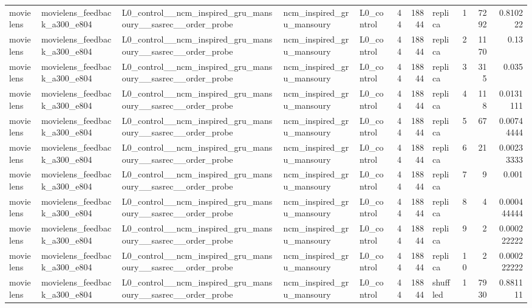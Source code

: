 \begin{table}[htbp!]
\begin{tabular}{lllllrrlrrr}
movielens & movielens\_feedback\_a300\_e804 & L0\_control\_\_ncm\_inspired\_gru\_mansoury\_\_sasrec\_\_order\_probe & ncm\_inspired\_gru\_mansoury & L0\_control & 44 & 18844 & replica & 1 & 7292 & 0.810222 \\
movielens & movielens\_feedback\_a300\_e804 & L0\_control\_\_ncm\_inspired\_gru\_mansoury\_\_sasrec\_\_order\_probe & ncm\_inspired\_gru\_mansoury & L0\_control & 44 & 18844 & replica & 2 & 1170 & 0.13 \\
movielens & movielens\_feedback\_a300\_e804 & L0\_control\_\_ncm\_inspired\_gru\_mansoury\_\_sasrec\_\_order\_probe & ncm\_inspired\_gru\_mansoury & L0\_control & 44 & 18844 & replica & 3 & 315 & 0.035 \\
movielens & movielens\_feedback\_a300\_e804 & L0\_control\_\_ncm\_inspired\_gru\_mansoury\_\_sasrec\_\_order\_probe & ncm\_inspired\_gru\_mansoury & L0\_control & 44 & 18844 & replica & 4 & 118 & 0.0131111 \\
movielens & movielens\_feedback\_a300\_e804 & L0\_control\_\_ncm\_inspired\_gru\_mansoury\_\_sasrec\_\_order\_probe & ncm\_inspired\_gru\_mansoury & L0\_control & 44 & 18844 & replica & 5 & 67 & 0.00744444 \\
movielens & movielens\_feedback\_a300\_e804 & L0\_control\_\_ncm\_inspired\_gru\_mansoury\_\_sasrec\_\_order\_probe & ncm\_inspired\_gru\_mansoury & L0\_control & 44 & 18844 & replica & 6 & 21 & 0.00233333 \\
movielens & movielens\_feedback\_a300\_e804 & L0\_control\_\_ncm\_inspired\_gru\_mansoury\_\_sasrec\_\_order\_probe & ncm\_inspired\_gru\_mansoury & L0\_control & 44 & 18844 & replica & 7 & 9 & 0.001 \\
movielens & movielens\_feedback\_a300\_e804 & L0\_control\_\_ncm\_inspired\_gru\_mansoury\_\_sasrec\_\_order\_probe & ncm\_inspired\_gru\_mansoury & L0\_control & 44 & 18844 & replica & 8 & 4 & 0.000444444 \\
movielens & movielens\_feedback\_a300\_e804 & L0\_control\_\_ncm\_inspired\_gru\_mansoury\_\_sasrec\_\_order\_probe & ncm\_inspired\_gru\_mansoury & L0\_control & 44 & 18844 & replica & 9 & 2 & 0.000222222 \\
movielens & movielens\_feedback\_a300\_e804 & L0\_control\_\_ncm\_inspired\_gru\_mansoury\_\_sasrec\_\_order\_probe & ncm\_inspired\_gru\_mansoury & L0\_control & 44 & 18844 & replica & 10 & 2 & 0.000222222 \\
movielens & movielens\_feedback\_a300\_e804 & L0\_control\_\_ncm\_inspired\_gru\_mansoury\_\_sasrec\_\_order\_probe & ncm\_inspired\_gru\_mansoury & L0\_control & 44 & 18844 & shuffled & 1 & 7930 & 0.881111 \\

\end{tabular}
\end{table}
